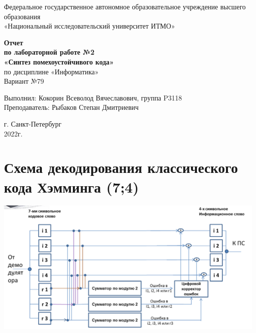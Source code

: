 \documentclass[12pt,onecolumn]{article}
\begin{document}
\begin{center}
    Федеральное государственное автономное образовательное учреждение высшего образования\\
	«Национальный исследовательский университет ИТМО»
\end{center}
\vspace{1cm}
\setcounter{page}{0} 
\begin{center}
    \large \textbf{Отчет}\\
    \textbf{по лабораторной работе №2}\\
    \large \textbf{«Синтез помехоустойчивого кода»}\\
     по дисциплине «Информатика»\\
	\vspace{1cm}
    Вариант №79\\
\end{center}

\vspace{10cm}
\begin{flushright}
  Выполнил: Кокорин Всеволод Вячеславович, группа P3118\\
  Преподаватель: Рыбаков Степан Дмитриевич\\
\end{flushright}

\vspace{5cm}
\begin{center}
    г. Санкт-Петербург\\
    2022г.
\end{center}
\thispagestyle{empty}
\newpage
\tableofcontents
\newpage
\section{Схема декодирования классического кода Хэмминга (7;4)}
\includegraphics[width=15cm]{img/img1.png}
\newpage
\end{document}
